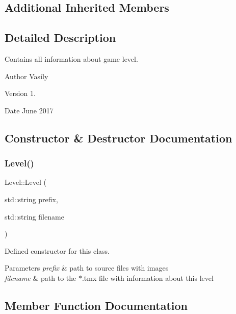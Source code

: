 \subsection*{Additional Inherited Members}


\subsection{Detailed Description}
Contains all information about game level. 

\begin{DoxyAuthor}{Author}
Vasily 
\end{DoxyAuthor}
\begin{DoxyVersion}{Version}
1. 
\end{DoxyVersion}
\begin{DoxyDate}{Date}
June 2017 
\end{DoxyDate}


\subsection{Constructor \& Destructor Documentation}
\mbox{\label{class_level_ae66cbb137b426e4dd1c9f0566ca04aa1}} 
\subsubsection{\texorpdfstring{Level()}{Level()}}
{\footnotesize\ttfamily Level\+::\+Level (\begin{DoxyParamCaption}\item[{std\+::string}]{prefix,  }\item[{std\+::string}]{filename }\end{DoxyParamCaption})}



Defined constructor for this class. 


\begin{DoxyParams}{Parameters}
{\em prefix} & path to source files with images \\
\hline
{\em filename} & path to the $\ast$.tmx file with information about this level \\
\hline
\end{DoxyParams}


\subsection{Member Function Documentation}
\mbox{\label{class_level_ac8bdc4273913a8f0bf8523c6fe20450a}} 
